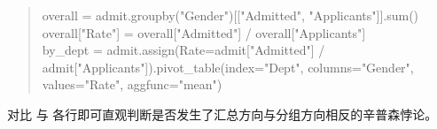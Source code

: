 \begin{exercise}[title={Pandas 综合查询与多维下钻编程},level=advanced,points=18,tags={Pandas,布尔索引,groupby,pivot\_table}]
\begin{solution}
\begin{enumerate}
  \begin{quote}\ttfamily\small
    overall = admit.groupby("Gender")[["Admitted", "Applicants"]].sum()\\
    overall["Rate"] = overall["Admitted"] / overall["Applicants"]\\
    by\_dept = admit.assign(Rate=admit["Admitted"] / admit["Applicants"]).pivot\_table(index="Dept", columns="Gender", values="Rate", aggfunc="mean")
  \end{quote}
  对比  与  各行即可直观判断是否发生了汇总方向与分组方向相反的辛普森悖论。
\end{enumerate}
\end{solution}
\end{exercise}
